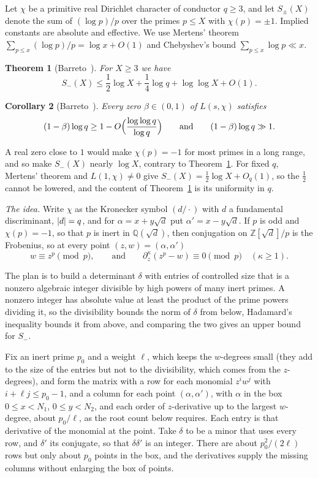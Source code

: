 \documentclass[11pt]{amsart}
\newtheorem{theorem}{Theorem}
\newtheorem{corollary}[theorem]{Corollary}
\theoremstyle{remark}
\newcommand{\Z}{\mathbb{Z}}
\newcommand{\Q}{\mathbb{Q}}
\newcommand{\sd}{\sqrt{d}}
\DeclarePairedDelimiter\abs{\lvert}{\rvert}
\begin{document}
Let $\chi$ be a primitive real Dirichlet character of conductor $q\ge3$, and let $S_\pm(X)$ denote
the sum of $(\log p)/p$ over the primes $p\le X$ with $\chi(p)=\pm1$. Implied constants are
absolute and effective. We use Mertens' theorem $\sum_{p\le x}(\log p)/p=\log x+O(1)$ and Chebyshev's
bound $\sum_{p\le x}\log p\ll x$.

\begin{theorem}[Barreto~\cite{Barreto}]\label{thm:main}
For $X\ge3$ we have
\[
S_-(X)\le\frac12\log X+\frac14\log q+\log\log X+O(1).
\]
\end{theorem}

\begin{corollary}[Barreto~\cite{Barreto}]\label{cor:siegel}
Every zero $\beta\in(0,1)$ of $L(s,\chi)$ satisfies
\[
(1-\beta)\log q\ge1-O\Bigl(\frac{\log\log q}{\log q}\Bigr)\qquad\textup{and}\qquad(1-\beta)\log q\gg1.
\]
\end{corollary}


A real zero close to $1$ would make $\chi(p)=-1$ for most primes in a long range, and so make
$S_-(X)$ nearly $\log X$, contrary to Theorem~\ref{thm:main}. For fixed $q$, Mertens' theorem and
$L(1,\chi)\ne0$ give $S_-(X)=\frac12\log X+O_q(1)$, so the $\frac12$ cannot be lowered,
and the content of Theorem~\ref{thm:main} is its uniformity in $q$.

\emph{The idea.} Write $\chi$ as the Kronecker symbol $(d/\cdot)$ with $d$ a fundamental discriminant, $\abs{d}=q$, and for
$\alpha=x+y\sd$ put $\alpha'=x-y\sd$. If $p$ is odd and $\chi(p)=-1$, so that $p$ is inert
in $\Q(\sd)$, then conjugation on $\Z[\sd]/p$ is the Frobenius, so at every point $(z,w)=(\alpha,\alpha')$
\begin{equation}\label{eq:fact}
w\equiv z^p\pmod p,\qquad\text{and}\qquad\partial_z^\kappa(z^p-w)\equiv0\pmod p\quad(\kappa\ge1).
\end{equation}

The plan is to build a determinant $\delta$ with entries of controlled size that is a nonzero
algebraic integer divisible by high powers of many inert primes. A nonzero integer has absolute value at least the product of the
prime powers dividing it, so the divisibility bounds the norm of $\delta$ from below, Hadamard's
inequality bounds it from above, and comparing the two gives an upper bound for $S_-$.

Fix an inert prime $p_0$ and a weight $\ell$, which keeps the $w$-degrees small (they add to the size of the
entries but not to the divisibility, which comes from the $z$-degrees), and form the matrix with a row for each monomial $z^iw^j$
with $i+\ell j\le p_0-1$, and a column for each point $(\alpha,\alpha')$, with $\alpha$ in the box
$0\le x<N_1$, $0\le y<N_2$, and each order of $z$-derivative up to the largest $w$-degree, about $p_0/\ell$, as the root
count below requires. Each entry is that
derivative of the monomial at the point. Take $\delta$ to be a minor that uses every row, and $\delta'$
its conjugate, so that $\delta\delta'$ is an integer. There are about $p_0^2/(2\ell)$ rows but only about $p_0$ points in the box, and the
derivatives supply the missing columns without enlarging the box of points.
\end{document}
